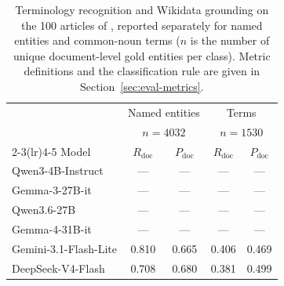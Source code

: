 \begin{table}[t]
\centering
\small
\setlength{\tabcolsep}{4pt}
\begin{tabular}{@{}lcccc@{}}
\toprule
 & \multicolumn{2}{c}{Named entities} & \multicolumn{2}{c}{Terms} \\
 & \multicolumn{2}{c}{\scriptsize $n{=}4032$} & \multicolumn{2}{c}{\scriptsize $n{=}1530$} \\
\cmidrule(lr){2-3}\cmidrule(lr){4-5}
Model & $R_{\mathrm{doc}}$ & $P_{\mathrm{doc}}$ & $R_{\mathrm{doc}}$ & $P_{\mathrm{doc}}$ \\
\midrule
Qwen3-4B-Instruct     & --- & --- & --- & --- \\
Gemma-3-27B-it        & --- & --- & --- & --- \\
Qwen3.6-27B           & --- & --- & --- & --- \\
Gemma-4-31B-it        & --- & --- & --- & --- \\
Gemini-3.1-Flash-Lite & 0.810 & 0.665 & 0.406 & 0.469 \\
DeepSeek-V4-Flash     & 0.708 & 0.680 & 0.381 & 0.499 \\
\bottomrule
\end{tabular}
\caption{Terminology recognition and Wikidata grounding on the 100 articles
of \datasetWikipediaName{}, reported separately for named entities and
common-noun terms ($n$ is the number of unique document-level gold
entities per class). Metric definitions and the classification rule are
given in Section~\ref{sec:eval-metrics}.}
\label{tab:grounding-results}
\end{table}
